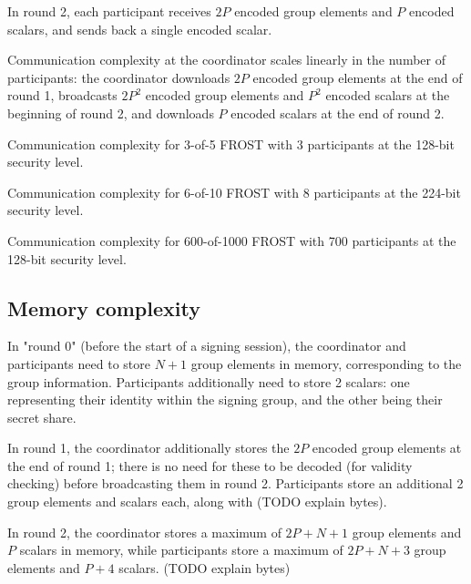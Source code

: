 In round 2, each participant receives $2P$ encoded group elements and $P$
encoded scalars, and sends back a single encoded scalar.

Communication complexity at the coordinator scales linearly in the number of
participants: the coordinator downloads $2P$ encoded group elements at the end
of round 1, broadcasts $2P^2$ encoded group elements and $P^2$ encoded scalars
at the beginning of round 2, and downloads $P$ encoded scalars at the end of
round 2.

\begin{table}
	\centering
	\caption{Communication complexity for 3-of-5 FROST with 3 participants at the 128-bit security level.}
\end{table}

\begin{table}
	\centering
	\caption{Communication complexity for 6-of-10 FROST with 8 participants at the 224-bit security level.}
\end{table}

\begin{table}
	\centering
	\caption{Communication complexity for 600-of-1000 FROST with 700 participants at the 128-bit security level.}
\end{table}

\subsection{Memory complexity}

In "round 0" (before the start of a signing session), the coordinator and
participants need to store $N + 1$ group elements in memory, corresponding to
the group information. Participants additionally need to store 2 scalars: one
representing their identity within the signing group, and the other being their
secret share.

In round 1, the coordinator additionally stores the $2P$ encoded group elements
at the end of round 1; there is no need for these to be decoded (for validity
checking) before broadcasting them in round 2. Participants store an additional
2 group elements and scalars each, along with (TODO explain bytes).

In round 2, the coordinator stores a maximum of $2P + N + 1$ group elements and
$P$ scalars in memory, while participants store a maximum of $2P + N + 3$ group
elements and $P + 4$ scalars. (TODO explain bytes)

